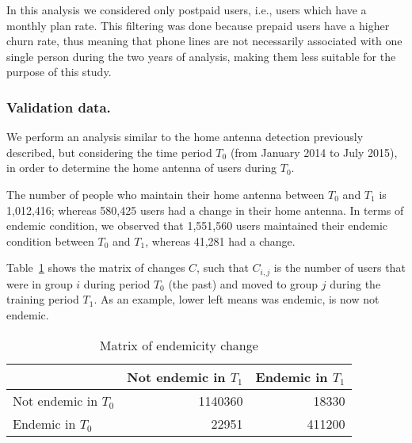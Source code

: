 In this analysis we considered only postpaid users, i.e., users which have a monthly  plan rate. This filtering was done because prepaid users have a higher churn rate, thus meaning that phone lines are not necessarily associated with one single person during the two years of analysis, making them less suitable for the purpose of this study.





\subsubsection{Validation data.} %

We perform an analysis similar to the home antenna detection previously described, 
but considering the time period $T_0$ (from January 2014 to July 2015),
in order to determine the home antenna of users during $T_0$.

The number of people who maintain their home antenna between $T_0$ and $T_1$ is 1,012,416;
whereas 580,425 users had a change in their home antenna.
In terms of endemic condition, we observed that 1,551,560 users maintained their endemic condition
between $T_0$ and $T_1$, whereas 41,281 had a change.


%
%
%

Table~\cref{tab:changes} 
shows the matrix of changes $C$, such that $C_{i, j}$ is the number of users that were in group $i$ during period $T_0$ (the past) and moved to group $j$ during the training period $T_1$. As an example, lower left means was endemic, is now not endemic. 

\begin{table}[ht]
	\caption{Matrix of endemicity change}
	\label{tab:changes}
	\centering
	\begin{tabular}{l r r }
		\toprule
		& Not endemic in $T_1$ & Endemic in $T_1$ \\
		\midrule
		Not endemic in $T_0$ & 1140360 & 18330   \\
		Endemic in $T_0$       & 22951    & 411200 \\
		\bottomrule
	\end{tabular}
\end{table}

